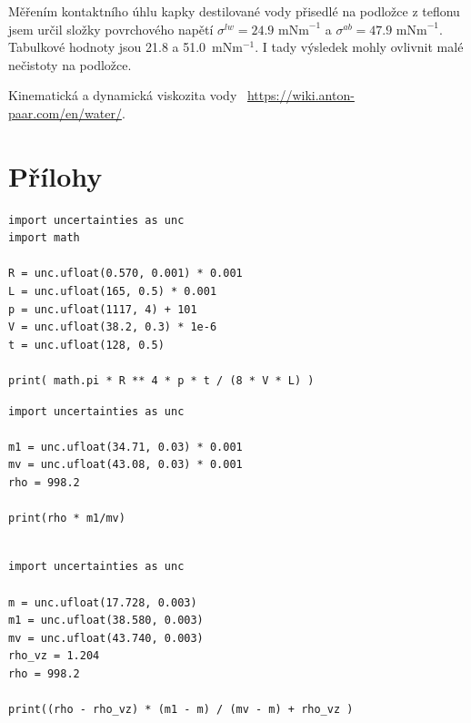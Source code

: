 \documentclass[a4paper,11pt]{article}
\begin{document}
Měřením kontaktního úhlu kapky destilované vody přisedlé na podložce z teflonu jsem určil složky povrchového napětí $\sigma^{lw} = 24.9 \text{ mNm}^{-1}$ a $\sigma^{ab} = 47.9 \text{ mNm}^{-1}$. Tabulkové hodnoty jsou 21.8 a 51.0~mNm$^{-1}$. I tady výsledek mohly ovlivnit malé nečistoty na podložce.


\begin{thebibliography}{0}
 Kinematická a dynamická viskozita vody ~\url{https://wiki.anton-paar.com/en/water/}.   
\end{thebibliography}



\section{Přílohy}

\begin{lstlisting}[caption={Výpočet dynamické viskozity Mariottovou lahví}]
import uncertainties as unc
import math

R = unc.ufloat(0.570, 0.001) * 0.001
L = unc.ufloat(165, 0.5) * 0.001
p = unc.ufloat(1117, 4) + 101
V = unc.ufloat(38.2, 0.3) * 1e-6
t = unc.ufloat(128, 0.5) 

print( math.pi * R ** 4 * p * t / (8 * V * L) )
\end{lstlisting}

\begin{lstlisting}[caption={Výpočet hustoty lihu metodou ponorného tělíska}]
import uncertainties as unc

m1 = unc.ufloat(34.71, 0.03) * 0.001
mv = unc.ufloat(43.08, 0.03) * 0.001
rho = 998.2

print(rho * m1/mv)
  
\end{lstlisting}

\begin{lstlisting}[caption={Výpočet hustoty lihu pomocí pyknometru}]
import uncertainties as unc

m = unc.ufloat(17.728, 0.003)
m1 = unc.ufloat(38.580, 0.003)
mv = unc.ufloat(43.740, 0.003)
rho_vz = 1.204
rho = 998.2

print((rho - rho_vz) * (m1 - m) / (mv - m) + rho_vz )
\end{lstlisting}
\end{document}
